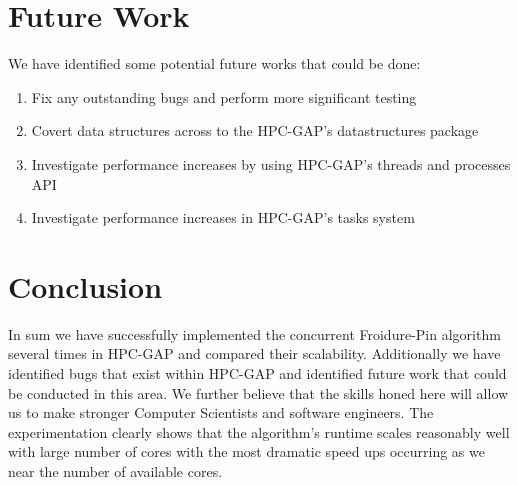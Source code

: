 \documentclass{report}
\begin{document}
\section*{Future Work}
We have identified some potential future works that could be done:

\begin{enumerate}
\item Fix any outstanding bugs and perform more significant testing
\item Covert data structures across to the HPC-GAP's datastructures package\cite{ds}
\item Investigate performance increases by using HPC-GAP's threads and processes API
\item Investigate performance increases in HPC-GAP's tasks system
\end{enumerate}

\section*{Conclusion}
In sum we have successfully implemented the concurrent Froidure-Pin algorithm several times in HPC-GAP and compared their scalability.
Additionally we have identified bugs that exist within HPC-GAP and identified future work that could be conducted in this area.
\newline
We further believe that the skills honed here will allow us to make stronger Computer Scientists and software engineers.
\newline
The experimentation clearly shows that the algorithm's runtime scales reasonably well with large number of cores with the most dramatic speed ups occurring as we near the number of available cores. 




\end{document}
